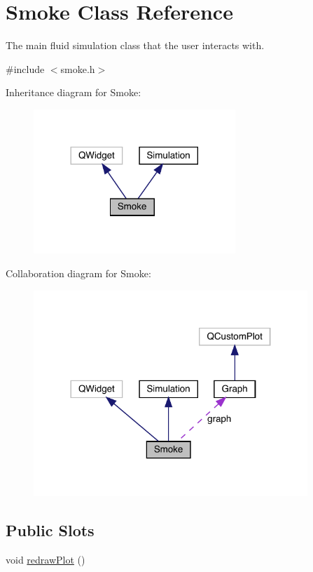 \hypertarget{classSmoke}{}\section{Smoke Class Reference}
\label{classSmoke}


The main fluid simulation class that the user interacts with.  




{\ttfamily \#include $<$smoke.\+h$>$}



Inheritance diagram for Smoke\+:\nopagebreak
\begin{figure}[H]
\begin{center}
\leavevmode
\includegraphics[width=216pt]{classSmoke__inherit__graph}
\end{center}
\end{figure}


Collaboration diagram for Smoke\+:\nopagebreak
\begin{figure}[H]
\begin{center}
\leavevmode
\includegraphics[width=293pt]{classSmoke__coll__graph}
\end{center}
\end{figure}
\subsection*{Public Slots}
\begin{DoxyCompactItemize}
\item 
void \mbox{\hyperlink{classSmoke_a558447ca2b067daebfca58a2d8b30f66}{redraw\+Plot}} ()
\end{DoxyCompactItemize}
